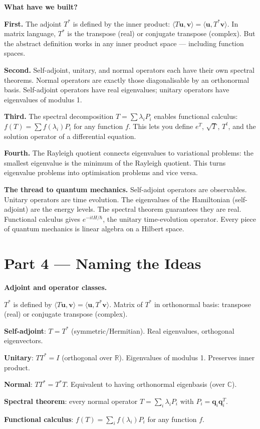 \documentclass[12pt,a4paper]{article}
\newcounter{problem}
\begin{document}
\begin{discoverybox}
\textbf{What have we built?}

\textbf{First.} The adjoint $T^*$ is defined by the inner product: $\langle T\mathbf{u},\mathbf{v}\rangle = \langle\mathbf{u},T^*\mathbf{v}\rangle$. In matrix language, $T^*$ is the transpose (real) or conjugate transpose (complex). But the abstract definition works in any inner product space --- including function spaces.

\textbf{Second.} Self-adjoint, unitary, and normal operators each have their own spectral theorems. Normal operators are exactly those diagonalisable by an orthonormal basis. Self-adjoint operators have real eigenvalues; unitary operators have eigenvalues of modulus 1.

\textbf{Third.} The spectral decomposition $T = \sum\lambda_i P_i$ enables functional calculus: $f(T) = \sum f(\lambda_i)P_i$ for any function $f$. This lets you define $e^T$, $\sqrt{T}$, $T^t$, and the solution operator of a differential equation.

\textbf{Fourth.} The Rayleigh quotient connects eigenvalues to variational problems: the smallest eigenvalue is the minimum of the Rayleigh quotient. This turns eigenvalue problems into optimisation problems and vice versa.

\medskip
\textbf{The thread to quantum mechanics.} Self-adjoint operators are observables. Unitary operators are time evolution. The eigenvalues of the Hamiltonian (self-adjoint) are the energy levels. The spectral theorem guarantees they are real. Functional calculus gives $e^{-itH/\hbar}$, the unitary time-evolution operator. Every piece of quantum mechanics is linear algebra on a Hilbert space.
\end{discoverybox}

\section{Part 4 \texorpdfstring{---}{--} Naming the Ideas}

\begin{namebox}
\textbf{Adjoint and operator classes.}

$T^*$ is defined by $\langle T\mathbf{u},\mathbf{v}\rangle = \langle\mathbf{u},T^*\mathbf{v}\rangle$. Matrix of $T^*$ in orthonormal basis: transpose (real) or conjugate transpose (complex).

\textbf{Self-adjoint}: $T=T^*$ (symmetric/Hermitian). Real eigenvalues, orthogonal eigenvectors.

\textbf{Unitary}: $TT^*=I$ (orthogonal over $\mathbb{R}$). Eigenvalues of modulus 1. Preserves inner product.

\textbf{Normal}: $TT^*=T^*T$. Equivalent to having orthonormal eigenbasis (over $\mathbb{C}$).

\textbf{Spectral theorem}: every normal operator $T = \sum_i\lambda_i P_i$ with $P_i = \mathbf{q}_i\mathbf{q}_i^T$.

\textbf{Functional calculus}: $f(T) = \sum_i f(\lambda_i)P_i$ for any function $f$.
\end{namebox}
\end{document}
